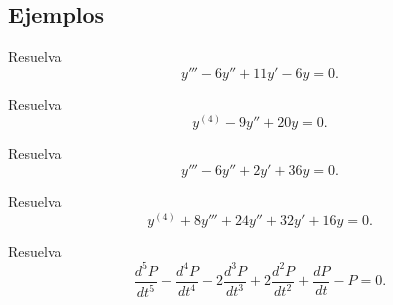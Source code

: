 \subsection{Ejemplos}


\begin{problema}
	\label{bron:exmp:10.1}
	Resuelva
	$$
	y'''-6y''+11y'-6y=0.
	$$
\end{problema}




\begin{problema}
	\label{bron:10.2}
	Resuelva
	$$
	y^{(4)}-9y''+20y=0.
	$$
\end{problema}




\begin{problema}
	\label{bron:10.4}
	Resuelva
	$$
	y'''-6y''+2y'+36y=0.
	$$
\end{problema}




\begin{problema}
	\label{bron:10.6}
	Resuelva
	$$
	y^{(4)}+8y'''+24y''+32y'+16y=0.
	$$
\end{problema}




\begin{problema}
	\label{bron:10.7}
	Resuelva
	$$
	\dfrac{d^{5}P}{dt^{5}}
	-\dfrac{d^{4}P}{dt^{4}}
	-2\dfrac{d^{3}P}{dt^{3}}
	+2\dfrac{d^{2}P}{dt^{2}}
	+\dfrac{dP}{dt}-P=0.
	$$
\end{problema}



